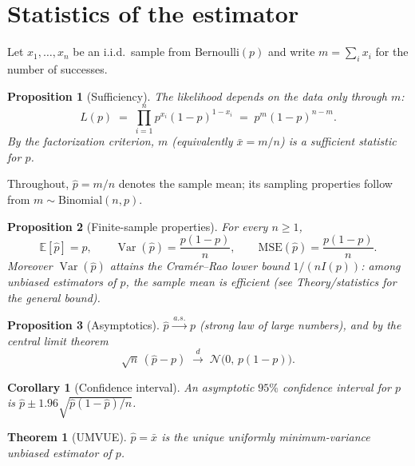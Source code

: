 \documentclass[11pt]{article}
\newtheorem{theorem}{Theorem}
\newtheorem{proposition}{Proposition}
\newtheorem{corollary}{Corollary}
\theoremstyle{remark}
\newcommand{\E}{\mathbb{E}}
\newcommand{\Var}{\operatorname{Var}}
\newcommand{\xbar}{\bar{x}}
\newcommand{\phat}{\hat{p}}
\begin{document}
\section{Statistics of the estimator}

Let $x_1, \dots, x_n$ be an i.i.d.\ sample from
$\mathrm{Bernoulli}(p)$ and write $m = \sum_i x_i$ for the number of
successes.

\begin{proposition}[Sufficiency]
The likelihood depends on the data only through $m$:
\begin{equation}
  L(p) \;=\; \prod_{i=1}^{n} p^{x_i}(1-p)^{1-x_i}
        \;=\; p^{m}(1-p)^{n-m}.
  \label{eq:lik}
\end{equation}
By the factorization criterion, $m$ (equivalently $\xbar = m/n$) is a
sufficient statistic for $p$.
\end{proposition}

Throughout, $\phat = m/n$ denotes the sample mean; its sampling
properties follow from $m \sim \mathrm{Binomial}(n, p)$.

\begin{proposition}[Finite-sample properties]
\label{prop:finite}
For every $n \ge 1$,
\begin{equation}
  \E[\phat] = p,
  \qquad
  \Var(\phat) = \frac{p(1-p)}{n},
  \qquad
  \mathrm{MSE}(\phat) = \frac{p(1-p)}{n}.
\end{equation}
Moreover $\Var(\phat)$ attains the Cram\'er--Rao lower bound
$1/(n I(p))$: among unbiased estimators of $p$, the sample mean is
\emph{efficient} (see \textnormal{Theory/statistics} for the general
bound).
\end{proposition}

\begin{proposition}[Asymptotics]
\label{prop:asym}
$\phat \xrightarrow{\,a.s.\,} p$ (strong law of large numbers), and by
the central limit theorem
\begin{equation}
  \sqrt{n}\,(\phat - p) \;\xrightarrow{\ d\ }\;
  \mathcal{N}\bigl(0,\, p(1-p)\bigr).
  \label{eq:clt}
\end{equation}
\end{proposition}

\begin{corollary}[Confidence interval]
An asymptotic $95\%$ confidence interval for $p$ is
$\phat \pm 1.96\sqrt{\phat(1-\phat)/n}$.
\end{corollary}

\begin{theorem}[UMVUE]
\label{thm:umvue}
$\phat = \xbar$ is the unique uniformly minimum-variance unbiased
estimator of $p$.
\end{theorem}
\end{document}
